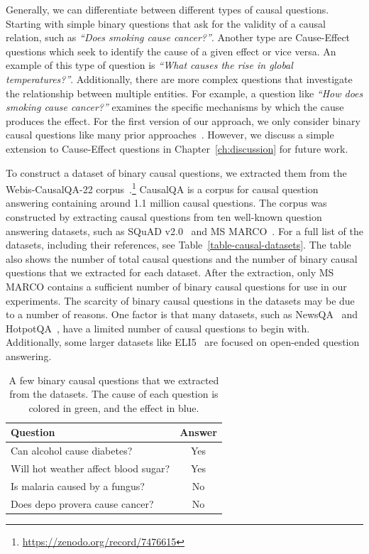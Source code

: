 Generally, we can differentiate between different types of causal questions.
Starting with simple binary questions that ask for the validity of a 
causal relation, such as \textit{``Does smoking cause cancer?''}. Another type are 
Cause-Effect questions which seek to identify the cause of a given effect or vice versa.
An example of this type of question is \textit{``What causes the rise in global temperatures?''}.
Additionally, there are more complex questions that investigate the relationship between multiple entities.
For example, a question like \textit{``How does smoking cause cancer?''} examines the specific mechanisms by which the cause produces the effect.
For the first version of our approach, we only consider binary causal questions like 
many prior approaches~\cite{HassanzadeshCausalQA2019, KayeshCausalTransfer2020}.
However, we discuss a simple extension to Cause-Effect questions in Chapter~\ref{ch:discussion}
for future work.

To construct a dataset of binary causal questions, we extracted them from the Webis-CausalQA-22 corpus~\cite{Bondarenko2022CausalQA}.\footnote{\url{https://zenodo.org/record/7476615}}
CausalQA is a corpus for causal question answering containing around 1.1 million
causal questions. The corpus was constructed by extracting causal questions from ten
well-known question answering datasets, such as SQuAD v2.0~\cite{rajpurkar:2018} and MS MARCO~\cite{nguyen:2016}.
For a full list of the datasets, including their references, see Table~\ref{table-causal-datasets}.
The table also shows the number of total causal questions and the number of binary 
causal questions that we extracted for each dataset. After the extraction, only
MS MARCO contains a sufficient number of binary causal questions for use in our experiments.
The scarcity of binary causal questions in the datasets may be due to a number of reasons. One factor is that many datasets, 
such as NewsQA~\cite{trischler:2017} and HotpotQA~\cite{yang:2018}, have a limited number of causal questions to begin with.
Additionally, some larger datasets like ELI5~\cite{fan:2019} are focused on open-ended question
 answering.


\begin{table}
\caption{A few binary causal questions that we extracted from the datasets. The 
cause of each question is colored in \textcolor{tab20darkgreen}{green}, and the effect in \textcolor{tab20darkblue}{blue}.}
\label{table-example-questions}
	\centering
\begin{tabular}{lc}
	\toprule
	\textbf{Question} & \textbf{Answer}\\
	\midrule
	Can \textcolor{tab20darkgreen}{alcohol} cause \textcolor{tab20darkblue}{diabetes}? & Yes \\
	Will \textcolor{tab20darkgreen}{hot weather} affect \textcolor{tab20darkblue}{blood sugar}? & Yes \\
	Is \textcolor{tab20darkblue}{malaria} caused by a \textcolor{tab20darkgreen}{fungus}? & No \\
	Does \textcolor{tab20darkgreen}{depo provera} cause \textcolor{tab20darkblue}{cancer}? & No \\
	\bottomrule
\end{tabular}
\end{table}

